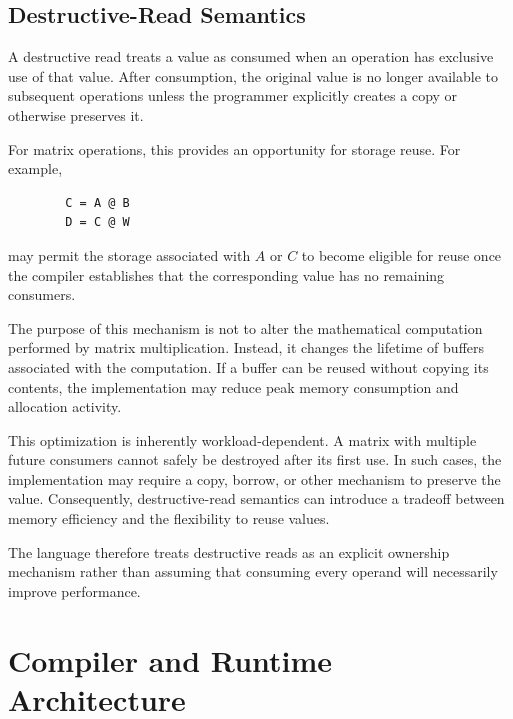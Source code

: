 \documentclass[a4paper]{article}
\begin{document}
	\subsection{Destructive-Read Semantics}
	
	A destructive read treats a value as consumed when an operation has exclusive use of that value. After consumption, the original value is no longer available to subsequent operations unless the programmer explicitly creates a copy or otherwise preserves it.
	
	For matrix operations, this provides an opportunity for storage reuse. For example,
	
	\begin{lstlisting}
		C = A @ B
		D = C @ W
	\end{lstlisting}
	
	may permit the storage associated with $A$ or $C$ to become eligible for reuse once the compiler establishes that the corresponding value has no remaining consumers.
	
	The purpose of this mechanism is not to alter the mathematical computation performed by matrix multiplication. Instead, it changes the lifetime of buffers associated with the computation. If a buffer can be reused without copying its contents, the implementation may reduce peak memory consumption and allocation activity.
	
	This optimization is inherently workload-dependent. A matrix with multiple future consumers cannot safely be destroyed after its first use. In such cases, the implementation may require a copy, borrow, or other mechanism to preserve the value. Consequently, destructive-read semantics can introduce a tradeoff between memory efficiency and the flexibility to reuse values.
	
	The language therefore treats destructive reads as an explicit ownership mechanism rather than assuming that consuming every operand will necessarily improve performance.
	
	\section{Compiler and Runtime Architecture}
	
	
\end{document}
